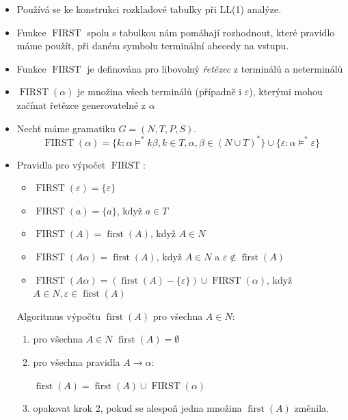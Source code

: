 \documentclass{article}
\begin{document}
\begin{itemize}
  \item Používá se ke konstrukci rozkladové tabulky při LL(1) analýze.
  \item Funkce $\operatorname{FIRST}$ spolu s tabulkou nám pomáhají rozhodnout, které pravidlo máme použít, při daném symbolu terminální abecedy na vstupu.
  \item Funkce $\operatorname{FIRST}$ je definována pro libovolný \emph{řetězec} z terminálů a neterminálů
  \item $\operatorname{FIRST}(\alpha)$ je množina všech terminálů (případně i $\varepsilon$), kterými mohou začínat řetězce generovatelné z $\alpha$
  \item Nechť máme gramatiku $ G = (N, T, P, S) $. $$\operatorname{FIRST}(\alpha) = \{k: \alpha \models^*k\beta , k \in T , \alpha, \beta \in (N \cup T)^*\} \cup \{ \varepsilon: \alpha \models^* \varepsilon\}$$
  \item Pravidla pro výpočet $\operatorname{FIRST}$:
  \begin{itemize}
    \item  $\operatorname{FIRST}(\varepsilon) = \{ \varepsilon\}$
    \item  $\operatorname{FIRST}(a) = \{ a\}$, když $a \in T$
    \item  $\operatorname{FIRST}(A) =\operatorname{first}(A)$, když $A \in N$
    \item  $\operatorname{FIRST}(A\alpha) = \operatorname{first}(A)$, když $A \in N$ a $\varepsilon \not\in \operatorname{first}(A)$
    \item  $\operatorname{FIRST}(A\alpha) = (\operatorname{first}(A) - \{\varepsilon\}) \cup \operatorname{FIRST}(\alpha)$, když $A \in N, \varepsilon \in \operatorname{first}(A)$
    \end{itemize}
  Algoritmus výpočtu $\operatorname{first}(A)$ pro všechna $A \in N$:
  \begin{enumerate}
    \item pro všechna $A \in N$ $ \operatorname{first}(A) = \emptyset$
    \item pro všechna pravidla $ A \rightarrow \alpha$:
  
    $ \operatorname{first}(A) = \operatorname{first}(A) \cup \operatorname{FIRST}(\alpha)$
    \item opakovat krok 2, pokud se alespoň jedna množina $\operatorname{first}(A)$ změnila.
  \end{enumerate}
\end{itemize}
\newpage
\end{document}
